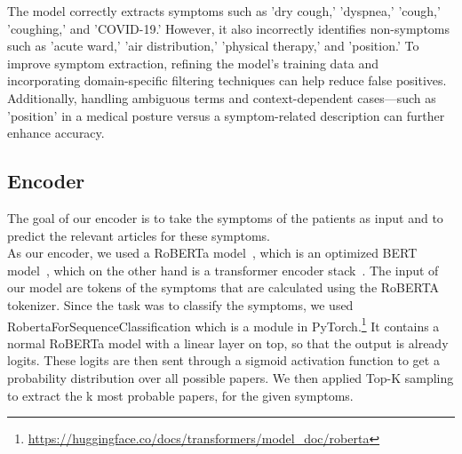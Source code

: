 The model correctly extracts symptoms such as 'dry cough,' 'dyspnea,' 'cough,' 'coughing,' and 'COVID-19.' However, it also incorrectly identifies non-symptoms such as 'acute ward,' 'air distribution,' 'physical therapy,' and 'position.' To improve symptom extraction, refining the model's training data and incorporating domain-specific filtering techniques can help reduce false positives. Additionally, handling ambiguous terms and context-dependent cases—such as 'position' in a medical posture versus a symptom-related description can further enhance accuracy.


\subsection{Encoder}
The goal of our encoder is to take the symptoms of the patients as input and to predict the relevant articles for these symptoms.\\
As our encoder, we used a RoBERTa model~\cite{liu2019robertarobustlyoptimizedbert}, which is an optimized BERT model~\cite{devlin2018bert}, which on the other hand is a transformer encoder stack~\cite{vaswani2017attention}. The input of our model are tokens of the symptoms that are calculated using the RoBERTA tokenizer. Since the task was to classify the symptoms, we used RobertaForSequenceClassification which is a module in PyTorch.\footnote{\url{https://huggingface.co/docs/transformers/model_doc/roberta}} It contains a normal RoBERTa model with a linear layer on top, so that the output is already logits. These logits are then sent through a sigmoid activation function to get a probability distribution over all possible papers. We then applied Top-K sampling to extract the k most probable papers, for the given symptoms.

